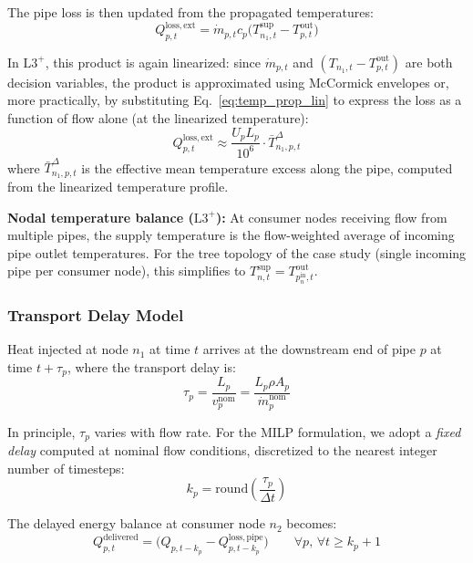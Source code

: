 \documentclass[review,3p]{elsarticle}
\newcommand{\Lplus}{\mathrm{L3}^{+}}
\begin{document}
The pipe loss is then updated from the propagated temperatures:
\begin{equation}
Q_{p,t}^{\mathrm{loss,ext}} = \dot{m}_{p,t} c_p
\big(T_{n_1,t}^{\mathrm{sup}} - T_{p,t}^{\mathrm{out}}\big)
\label{eq:loss_extended}
\end{equation}

In $\Lplus$, this product is again linearized: since
$\dot{m}_{p,t}$ and $(T_{n_1,t} - T_{p,t}^{\mathrm{out}})$ are
both decision variables, the product is approximated using
McCormick envelopes or, more practically, by substituting
Eq.~\eqref{eq:temp_prop_lin} to express the loss as a function of
flow alone (at the linearized temperature):
\begin{equation}
Q_{p,t}^{\mathrm{loss,ext}} \approx
\frac{U_p L_p}{10^6} \cdot
\bar{T}_{n_1,p,t}^{\Delta}
\label{eq:loss_ext_lin}
\end{equation}
where $\bar{T}_{n_1,p,t}^{\Delta}$ is the effective
mean temperature excess along the pipe, computed from the linearized
temperature profile.

\textbf{Nodal temperature balance ($\Lplus$):} At consumer nodes
receiving flow from multiple pipes, the supply temperature is the
flow-weighted average of incoming pipe outlet temperatures. For
the tree topology of the case study (single incoming pipe per
consumer node), this simplifies to
$T_{n,t}^{\mathrm{sup}} = T_{p_n^{\mathrm{in}},t}^{\mathrm{out}}$.

\subsubsection{Transport Delay Model}
\label{sec:model_delay}

Heat injected at node $n_1$ at time $t$ arrives at the downstream
end of pipe $p$ at time $t + \tau_p$, where the transport delay is:
\begin{equation}
\tau_p = \frac{L_p}{v_p^{\mathrm{nom}}}
= \frac{L_p \rho A_p}{\dot{m}_p^{\mathrm{nom}}}
\label{eq:delay}
\end{equation}

In principle, $\tau_p$ varies with flow rate. For the MILP
formulation, we adopt a \emph{fixed delay} computed at nominal
flow conditions, discretized to the nearest integer number of
timesteps:
\begin{equation}
k_p = \mathrm{round}\!\left(\frac{\tau_p}{\Delta t}\right)
\label{eq:delay_discrete}
\end{equation}

The delayed energy balance at consumer node $n_2$ becomes:
\begin{equation}
Q_{p,t}^{\mathrm{delivered}} =
\big(Q_{p,t-k_p} - Q_{p,t-k_p}^{\mathrm{loss,pipe}}\big)
\qquad \forall p,\, \forall t \geq k_p + 1
\label{eq:delayed_balance}
\end{equation}
\end{document}
